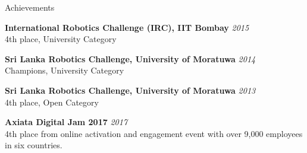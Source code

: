 \documentclass[
11pt, %
]{./assets/resume} %
\begin{document}
	

	



 
\begin{rSection}{Achievements}

	\textbf{International Robotics Challenge (IRC), IIT Bombay} \hfill \textit{2015}\\
	4th place, University Category

	\textbf{Sri Lanka Robotics Challenge, University of Moratuwa} \hfill \textit{2014}\\
	Champions, University Category

	\textbf{Sri Lanka Robotics Challenge, University of Moratuwa} \hfill \textit{2013}\\
	4th place, Open Category

	\textbf{Axiata Digital Jam 2017} \hfill \textit{2017}\\
	4th place from online activation and engagement event with over 9,000 employees in six countries.

\end{rSection}
\end{document}
